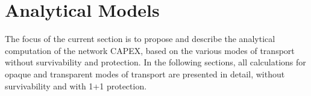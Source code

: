 
\chapter{Analytical Models}
\label{chap_analytical}
The focus of the current section is to propose and describe the analytical computation of the network CAPEX, based on the various modes of transport without survivability and protection.
In the following sections, all calculations for opaque and transparent modes of transport are presented in detail, without survivability and with 1+1 protection.






